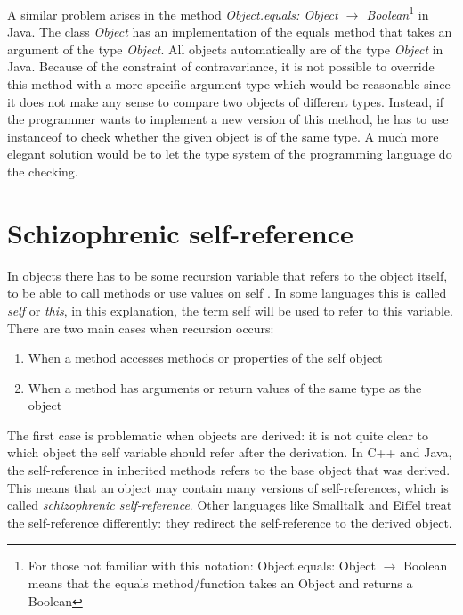 A similar problem arises in the method \emph{Object.equals: Object
$\rightarrow$ Boolean}\footnote{For those not familiar with this
notation: Object.equals: Object $\rightarrow$ Boolean means that
the equals method/function takes an Object and returns a Boolean}
in Java. The class \emph{Object} has an implementation of the equals
method that takes an argument of the type \emph{Object}. All objects
automatically are of the type \emph{Object} in Java.  Because of the
constraint of contravariance, it is not possible to override this method
with a more specific argument type which would be reasonable since it does
not make any sense to compare two objects of different types. Instead,
if the programmer wants to implement a new version of this method, he
has to use instanceof to check whether the given object is of the same
type. A much more elegant solution would be to let the type system of
the programming language do the checking.\\

\section{Schizophrenic self-reference}
\label{sec:schizoReferences}

In objects there has to be some recursion variable that refers to the
object itself, to be able to call methods or use values on self . 
In some languages this is called \emph{self} or \emph{this}, in
this explanation, the term self will be used to refer to this variable. \\

There are two main cases when recursion occurs:
\begin{enumerate}
\item When a method accesses methods or properties of the self object
\item When a method has arguments or return values of the same type as the object
\end{enumerate}

The first case is problematic when objects are derived: it is not quite
clear to which object the self variable should refer after the derivation.
In C++ and Java, the self-reference in inherited methods refers to the
base object that was derived. This means that an object may contain
many versions of self-references, which is called \emph{schizophrenic
self-reference}. Other languages like Smalltalk and Eiffel treat the
self-reference differently: they redirect the self-reference to the
derived object. \\

